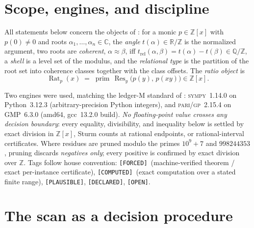 \documentclass[11pt]{article}
\newcommand{\F}{\textnormal{\texttt{[FORCED]}}}
\newcommand{\C}{\textnormal{\texttt{[COMPUTED]}}}
\newcommand{\Pl}{\textnormal{\texttt{[PLAUSIBLE]}}}
\newcommand{\Dc}{\textnormal{\texttt{[DECLARED]}}}
\newcommand{\Op}{\textnormal{\texttt{[OPEN]}}}
\newcommand{\Q}{\mathbb{Q}}
\newcommand{\Z}{\mathbb{Z}}
\newcommand{\R}{\mathbb{R}}
\newcommand{\Rat}{\operatorname{Rat}}
\newcommand{\Res}{\operatorname{Res}}
\newcommand{\gp}{\textsc{pari/gp}}
\newcommand{\sy}{\textsc{sympy}}
\theoremstyle{definition}
\begin{document}
\begin{abstract}
and a degree-$7$ Pisot invisible to all four certificate paths, caught only
by exact adjudication --- all scans inert, P7 resolved affirmatively
($3$ reducible-$\Rat^{\circ}$ instances, $S^{*}$ shrinking to degrees
$12/12/24$, still inert). \emph{v1.4 addendum:} the independent referee
pass's errata are folded --- E1: the degree-$2$ census is $7$, not $6$
($x^2-3x+1=\mathrm{minpoly}(\varphi^2)$ is reciprocal \emph{and} Pisot; the
``reciprocal $\Rightarrow$ not Pisot'' rule is \F\ only for degree
$\ge3$; P4 grows to $13$ instances, twelve strict $+$ the golden equality,
unfalsified); E2: the degree-$7$ display corrected to its $c$-vector; E3:
the both-straddle count is $163$ under the delivered predicate ($3$
twist-fixed $+$ $160$ two-member, all reducible). No theorem touched.
\end{abstract}

\section{Scope, engines, and discipline}\label{sec:scope}

All statements below concern the objects of \cite{relcharge}: for a monic
$p\in\Z[x]$ with $p(0)\neq 0$ and roots $\alpha_1,\dots,\alpha_n\in\mathbb{C}$,
the \emph{angle} $t(\alpha)\in\R/\Z$ is the normalized argument, two roots are
\emph{coherent}, $\alpha\approx\beta$, iff
$t_{\mathrm{rel}}(\alpha,\beta)=t(\alpha)-t(\beta)\in\Q/\Z$, a \emph{shell} is a
level set of the modulus, and the \emph{relational type} is the partition of the
root set into coherence classes together with the class offsets. The
\emph{ratio object} is
\[
\Rat_p(x)\;=\;\operatorname{prim}\,\Res_y\bigl(p(y),\,p(xy)\bigr)\in\Z[x].
\]

Two engines were used, matching the ledger-M standard of \cite{relcharge}:
\sy~1.14.0 on Python~3.12.3 (arbitrary-precision Python integers), and
\gp~2.15.4 on GMP~6.3.0 (amd64, gcc~13.2.0 build). \emph{No floating-point value
crosses any decision boundary}: every equality, divisibility, and inequality
below is settled by exact division in $\Z[x]$, Sturm counts at rational
endpoints, or rational-interval certificates. Where residues are pruned modulo
the primes $10^9{+}7$ and $998244353$, pruning discards \emph{negatives only};
every positive is confirmed by exact division over $\Z$. Tags follow house
convention: \F\ (machine-verified theorem / exact per-instance certificate),
\C\ (exact computation over a stated finite range), \Pl, \Dc, \Op.

\section{The scan as a decision procedure}\label{sec:scan}
\end{document}
